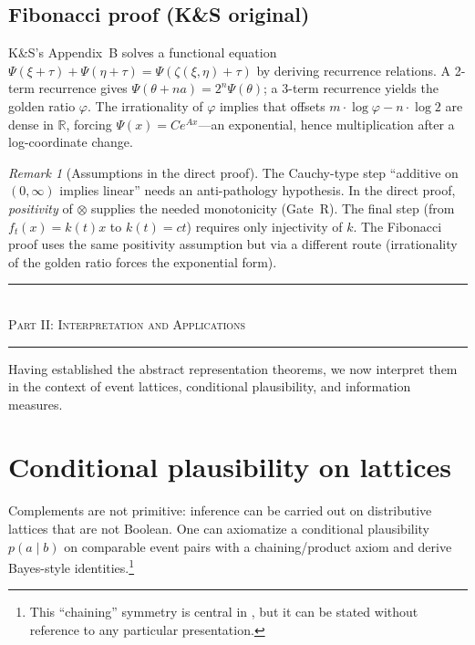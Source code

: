 \documentclass[11pt]{article}
\theoremstyle{definition}
\theoremstyle{remark}
\newtheorem{remark}[theorem]{Remark}
\begin{document}
\subsection{Fibonacci proof (K\&S original)}

K\&S's Appendix~B solves a functional equation $\Psi(\xi+\tau)+\Psi(\eta+\tau)=\Psi(\zeta(\xi,\eta)+\tau)$
by deriving recurrence relations.  A 2-term recurrence gives $\Psi(\theta+na)=2^n\Psi(\theta)$;
a 3-term recurrence yields the golden ratio $\varphi$.  The irrationality of $\varphi$ implies
that offsets $m\cdot\log\varphi - n\cdot\log 2$ are dense in $\mathbb{R}$, forcing
$\Psi(x)=Ce^{Ax}$---an exponential, hence multiplication after a log-coordinate change.

\begin{remark}[Assumptions in the direct proof]
The Cauchy-type step ``additive on $(0,\infty)$ implies linear'' needs an anti-pathology hypothesis.
In the direct proof, \emph{positivity} of $\otimes$ supplies the needed monotonicity (Gate~R).
The final step (from $f_t(x)=k(t)x$ to $k(t)=ct$) requires only injectivity of $k$.
The Fibonacci proof uses the same positivity assumption but via a different route
(irrationality of the golden ratio forces the exponential form).
\end{remark}

\newpage
\bigskip
\begin{center}
\rule{0.5\textwidth}{0.4pt}\\[0.5em]
\textsc{Part II: Interpretation and Applications}\\[0.3em]
\rule{0.5\textwidth}{0.4pt}
\end{center}
\bigskip

\noindent
Having established the abstract representation theorems, we now interpret them in the context of
event lattices, conditional plausibility, and information measures.

\section{Conditional plausibility on lattices}
\label{sec:conditioning}

Complements are not primitive: inference can be carried out on distributive lattices that are not Boolean.
One can axiomatize a conditional plausibility $p(a\mid b)$ on comparable event pairs with a
chaining/product axiom and derive Bayes-style identities.\footnote{This ``chaining'' symmetry is central in
\cite{KnuthSkilling2012}, but it can be stated without reference to any particular presentation.}
\end{document}

